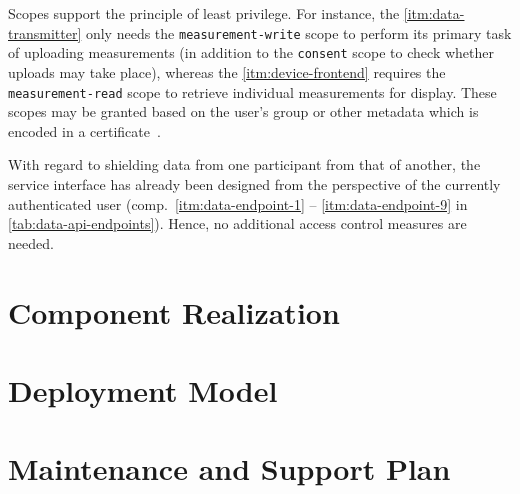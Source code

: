 \begin{description}
\FloatBarrier

	Scopes support the principle of least privilege. For instance, the \ref{itm:data-transmitter} only needs the \texttt{measurement-write} scope to perform its primary task of uploading measurements (in addition to the \texttt{consent} scope to check whether uploads may take place), whereas the \ref{itm:device-frontend} requires the \texttt{measurement-read} scope to retrieve individual measurements for display. These scopes may be granted based on the user's group or other metadata which is encoded in a certificate~\cite[p.~1]{butt2004certificate}.
\FloatBarrier

\end{description}

With regard to shielding data from one participant from that of another, the service interface has already been designed from the perspective of the currently authenticated user (comp.~\ref{itm:data-endpoint-1} -- \ref{itm:data-endpoint-9} in \autoref{tab:data-api-endpoints}). Hence, no additional access control measures are needed.


\section{Component Realization}
\label{sec:component-realization}


\section{Deployment Model}
\label{sec:deployment-model}


\section{Maintenance and Support Plan}
\label{sec:maintenance-and-support-plan}
